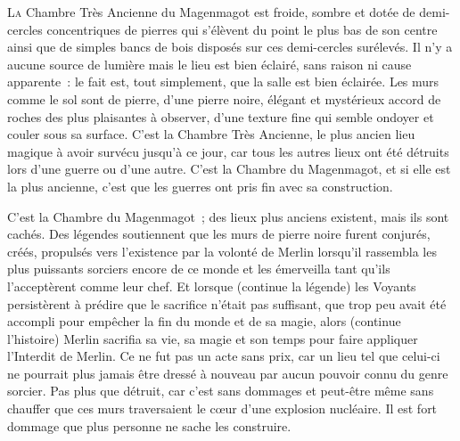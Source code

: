
\lettrine{L}{a} Chambre Très Ancienne du Magenmagot est froide, sombre et dotée de demi-cercles concentriques de pierres qui s'élèvent du point le plus bas de son centre ainsi que de simples bancs de bois disposés sur ces demi-cercles surélevés.
Il n'y a aucune source de lumière mais le lieu est bien éclairé, sans raison ni cause apparente~: le fait est, tout simplement, que la salle est bien éclairée.
Les murs comme le sol sont de pierre, d'une pierre noire, élégant et mystérieux accord de roches des plus plaisantes à observer, d'une texture fine qui semble ondoyer et couler sous sa surface.
C'est la Chambre Très Ancienne, le plus ancien lieu magique à avoir survécu jusqu'à ce jour, car tous les autres lieux ont été détruits lors d'une guerre ou d'une autre.
C'est la Chambre du Magenmagot, et si elle est la plus ancienne, c'est que les guerres ont pris fin avec sa construction.

C'est la Chambre du Magenmagot~; des lieux plus anciens existent, mais ils sont cachés.
Des légendes soutiennent que les murs de pierre noire furent conjurés, créés, propulsés vers l'existence par la volonté de Merlin lorsqu'il rassembla les plus puissants sorciers encore de ce monde et les émerveilla tant qu'ils l'acceptèrent comme leur chef.
Et lorsque (continue la légende) les Voyants persistèrent à prédire que le sacrifice n'était pas suffisant, que trop peu avait été accompli pour empêcher la fin du monde et de sa magie, alors (continue l'histoire) Merlin sacrifia sa vie, sa magie et son temps pour faire appliquer l'Interdit de Merlin.
Ce ne fut pas un acte sans prix, car un lieu tel que celui-ci ne pourrait plus jamais être dressé à nouveau par aucun pouvoir connu du genre sorcier.
Pas plus que détruit, car c'est sans dommages et peut-être même sans chauffer que ces murs traversaient le cœur d'une explosion nucléaire.
Il est fort dommage que plus personne ne sache les construire.

